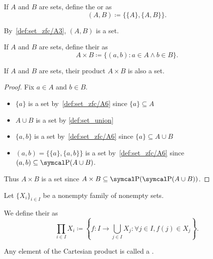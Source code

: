 \begin{definition}\label{def:kuratowski_pair}\cite[36]{Enderton1977}
  If \( A \) and \( B \) are sets, define the  or  as
  \begin{equation*}
    (A, B) \coloneqq \{ \{ A \}, \{ A, B \} \}.
  \end{equation*}

  By~\ref{def:set_zfc/A3}, \( (A, B) \) is a set.
\end{definition}

\begin{definition}\label{def:binary_cartesian_product}\cite[37]{Enderton1977}
  If \( A \) and \( B \) are sets, define their  as
  \begin{equation*}
    A \times B \coloneqq \{ (a, b) \colon a \in A \land b \in B \}.
  \end{equation*}
\end{definition}

\begin{proposition}\label{def:binary_cartesian_product_is_set}
  If \( A \) and \( B \) are sets, their product \( A \times B \) is also a set.
\end{proposition}
\begin{proof}
  Fix \( a \in A \) and \( b \in B \).
  \begin{itemize}
    \item \( \{ a \} \) is a set by~\ref{def:set_zfc/A6} since \( \{ a \} \subseteq A \)
    \item \( A \cup B \) is a set by \cref{def:set_union}
    \item \( \{ a, b \} \) is a set by~\ref{def:set_zfc/A6} since \( \{ a \} \subseteq A \cup B \)
    \item \( (a, b) = \{ \{ a \}, \{ a, b \} \} \) is a set by~\ref{def:set_zfc/A6} since \( (a, b) \subseteq \Power(A \cup B) \).
  \end{itemize}

  Thus \( A \times B \) is a set since \( A \times B \subseteq \Power(\Power(A \cup B)) \).
\end{proof}

\begin{definition}\label{def:cartesian_product}\cite[54]{Enderton1977}
  Let \( \{ X_i \}_{i \in I} \) be a nonempty family of nonempty sets.

  We define their  as
  \begin{equation*}
    \prod_{i \in I} X_i \coloneqq \left\{ f: I \to \bigcup_{j \in I} X_j \colon \forall j \in I, f(j) \in X_j \right\}.
  \end{equation*}

  Any element of the Cartesian product is called a .
\end{definition}

